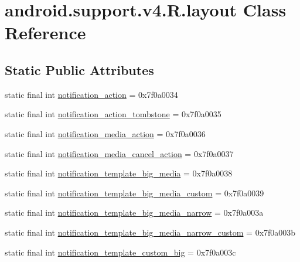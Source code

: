 \hypertarget{classandroid_1_1support_1_1v4_1_1_r_1_1layout}{}\section{android.\+support.\+v4.\+R.\+layout Class Reference}
\label{classandroid_1_1support_1_1v4_1_1_r_1_1layout}
\subsection*{Static Public Attributes}
\begin{DoxyCompactItemize}
\item 
static final int \mbox{\hyperlink{classandroid_1_1support_1_1v4_1_1_r_1_1layout_ac1411f1001043a2b326b906b8ff45fea}{notification\+\_\+action}} = 0x7f0a0034
\item 
static final int \mbox{\hyperlink{classandroid_1_1support_1_1v4_1_1_r_1_1layout_acb294013b8cd2a08ae0dffd96c702fdb}{notification\+\_\+action\+\_\+tombstone}} = 0x7f0a0035
\item 
static final int \mbox{\hyperlink{classandroid_1_1support_1_1v4_1_1_r_1_1layout_aca36a79f5eadb59146515ffed73c3777}{notification\+\_\+media\+\_\+action}} = 0x7f0a0036
\item 
static final int \mbox{\hyperlink{classandroid_1_1support_1_1v4_1_1_r_1_1layout_ae93bfe9691889264f234cdad70289374}{notification\+\_\+media\+\_\+cancel\+\_\+action}} = 0x7f0a0037
\item 
static final int \mbox{\hyperlink{classandroid_1_1support_1_1v4_1_1_r_1_1layout_a4532849f97a2ea66c7969abe576d998d}{notification\+\_\+template\+\_\+big\+\_\+media}} = 0x7f0a0038
\item 
static final int \mbox{\hyperlink{classandroid_1_1support_1_1v4_1_1_r_1_1layout_a26f42a4c35af6add5b7cef3a03008f5f}{notification\+\_\+template\+\_\+big\+\_\+media\+\_\+custom}} = 0x7f0a0039
\item 
static final int \mbox{\hyperlink{classandroid_1_1support_1_1v4_1_1_r_1_1layout_a8ce4e8b413c5345c2d47fc68c465a5ee}{notification\+\_\+template\+\_\+big\+\_\+media\+\_\+narrow}} = 0x7f0a003a
\item 
static final int \mbox{\hyperlink{classandroid_1_1support_1_1v4_1_1_r_1_1layout_a3f1c19efb3b6a1d34c0b4a6e3d8eaab8}{notification\+\_\+template\+\_\+big\+\_\+media\+\_\+narrow\+\_\+custom}} = 0x7f0a003b
\item 
static final int \mbox{\hyperlink{classandroid_1_1support_1_1v4_1_1_r_1_1layout_a67bb31b5622bc564c3af959470bab5b4}{notification\+\_\+template\+\_\+custom\+\_\+big}} = 0x7f0a003c

\end{DoxyCompactItemize}

